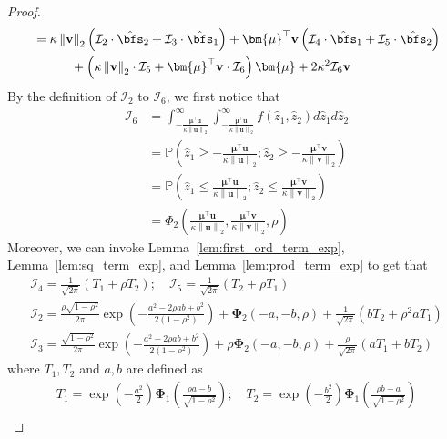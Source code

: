 \documentclass[10pt]{article} %
\theoremstyle{definition}
\theoremstyle{plain}
\newcommand{\paren}[1]{\left(#1\right)}
\newcommand{\norm}[1]{\left\|#1\right\|}
\def\bfu{{\mathbf{u}}}\def\bfv{{\mathbf{v}}}\def\bfw{{\mathbf{w}}}\def\bfx{{\mathbf{x}}}
\begin{document}
\begin{proof}
\begin{equation}
\begin{aligned}
            & = \kappa\norm{\bfv}_2\paren{\mathcal{I}_2\cdot\hat{\bfs}_2 + \mathcal{I}_3\cdot\hat{\bfs}_1} + \bm{\mu}^\top\bfv\paren{\mathcal{I}_4\cdot\hat{\bfs}_1+\mathcal{I}_5\cdot\hat{\bfs}_2}\\
            & \quad\quad\quad + \paren{\kappa\norm{\bfv}_2\cdot\mathcal{I}_5 + \bm{\mu}^\top\bfv\cdot\mathcal{I}_6}\bm{\mu} + 2\kappa^2\mathcal{I}_6\bfv
        \end{aligned}
    \end{equation}
    By the definition of $\mathcal{I}_2$ to $\mathcal{I}_6$, we first notice that
    \begin{align*}
        \mathcal{I}_6 & = \int_{-\frac{\bm{\mu}^\top\bfu}{\kappa\norm{\bfu}_2}}^\infty\int_{-\frac{\bm{\mu}^\top\bfu}{\kappa\norm{\bfu}_2}}^\infty f(\hat{z}_1,\hat{z}_2)d\hat{z}_1d\hat{z}_2\\
        & = \mathbb{P}\paren{\hat{z}_1 \geq -\frac{\bm{\mu}^\top\bfu}{\kappa\norm{\bfu}_2};\hat{z}_2\geq -\frac{\bm{\mu}^\top\bfv}{\kappa\norm{\bfv}_2}}\\
        & = \mathbb{P}\paren{\hat{z}_1\leq\frac{\bm{\mu}^\top\bfu}{\kappa\norm{\bfu}_2};\hat{z}_2\leq \frac{\bm{\mu}^\top\bfv}{\kappa\norm{\bfv}_2}}\\
        & = \Phi_2\paren{\frac{\bm{\mu}^\top\bfu}{\kappa\norm{\bfu}_2},\frac{\bm{\mu}^\top\bfv}{\kappa\norm{\bfv}_2},\rho}
    \end{align*}
    Moreover, we can invoke Lemma~\ref{lem:first_ord_term_exp}, Lemma~\ref{lem:sq_term_exp}, and Lemma~\ref{lem:prod_term_exp} to get that
    \begin{gather*}
        \mathcal{I}_4 =\frac{1}{\sqrt{2\pi}}\paren{T_1 + \rho T_2};\quad \mathcal{I}_5 = \frac{1}{\sqrt{2\pi}}\paren{T_2 + \rho T_1}\\
        \mathcal{I}_2 = \frac{\rho\sqrt{1-\rho^2}}{2\pi}\exp\paren{-\frac{a^2 - 2\rho ab + b^2}{2\paren{1-\rho^2}}} + \bm{\Phi}_2\paren{-a,-b,\rho} + \frac{1}{\sqrt{2\pi}}\paren{bT_2 + \rho^2 aT_1}\\
        \mathcal{I}_3 =  \frac{\sqrt{1-\rho^2}}{2\pi}\exp\paren{-\frac{a^2 - 2\rho ab + b^2}{2\paren{1-\rho^2}}} + \rho\bm{\Phi}_2\paren{-a,-b,\rho} + \frac{\rho}{\sqrt{2\pi}}\paren{aT_1 + bT_2}
    \end{gather*}
    where $T_1, T_2$ and $a, b$ are defined as
    \begin{gather*}
        T_1 = \exp\paren{-\frac{a^2}{2}}\bm{\Phi}_1\paren{\frac{\rho a - b}{\sqrt{1 - \rho^2}}};\quad T_2 = \exp\paren{-\frac{b^2}{2}}\bm{\Phi}_1\paren{\frac{\rho b - a}{\sqrt{1 - \rho^2}}}\\

\end{gather*}
\end{proof}
\end{document}
